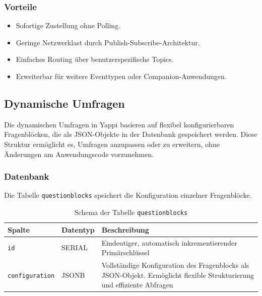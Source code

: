 \documentclass[12pt,a4paper]{report}
\begin{document}
    \subsubsection{Vorteile}
        \begin{itemize}
            \item Sofortige Zustellung ohne Polling.
            \item Geringe Netzwerklast durch Publish-Subscribe-Architektur.
            \item Einfaches Routing über benutzerspezifische Topics.
            \item Erweiterbar für weitere Eventtypen oder Companion-Anwendungen.
        \end{itemize}



\subsection{Dynamische Umfragen}
    Die dynamischen Umfragen in Yappi basieren auf flexibel konfigurierbaren Fragenblöcken, die als JSON-Objekte in der Datenbank gespeichert werden.
    Diese Struktur ermöglicht es, Umfragen anzupassen oder zu erweitern, ohne Änderungen am Anwendungscode vorzunehmen.

    \subsubsection{Datenbank}
        Die Tabelle \texttt{questionblocks} speichert die Konfiguration einzelner Fragenblöcke.

        \begin{table}[!htbp]
            \centering
            \begin{tabular}{|l|l|p{9cm}|}
                \hline
                    \textbf{Spalte} & \textbf{Datentyp} & \textbf{Beschreibung} \\
                \hline
                    \texttt{id} & SERIAL & Eindeutiger, automatisch inkrementierender Primärschlüssel \\
                    \texttt{configuration} & JSONB & Vollständige Konfiguration des Fragenblocks als JSON-Objekt.
                    Ermöglicht flexible Strukturierung und effiziente Abfragen \\
                \hline
            \end{tabular}
            \caption{Schema der Tabelle \texttt{questionblocks}}
            \label{tab:questionblocks_schema}
        \end{table}
\end{document}
